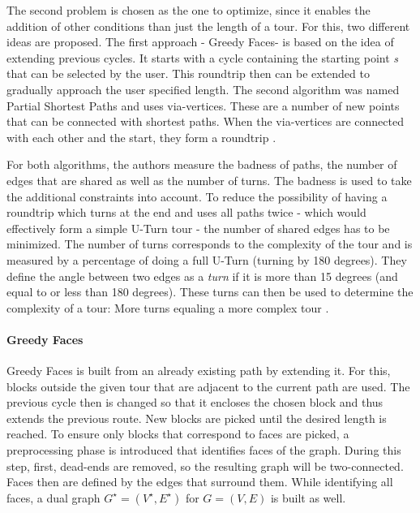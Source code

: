 The second problem is chosen as the one to optimize, since it enables the addition of other conditions than just the length of a tour.
For this, two different ideas are proposed.
The first approach - \glqq Greedy Faces\grqq - is based on the idea of extending previous cycles.
It starts with a cycle containing the starting point \textit{s} that can be selected by the user. 
This roundtrip then can be extended to gradually approach the user specified length. 
The second algorithm was named \glqq Partial Shortest Paths\grqq{} and uses via-vertices.
These are a number of new points that can be connected with shortest paths.
When the via-vertices are connected with each other and the start, they form a roundtrip \cite{gemsa_efficient_2013}.


For both algorithms, the authors measure the badness of paths, the number of edges that are shared as well as the number of turns.
The badness is used to take the additional constraints into account. 
To reduce the possibility of having a roundtrip which turns at the end and uses all paths twice - which would effectively form a simple U-Turn tour - the number of shared edges has to be minimized.
The number of turns corresponds to the complexity of the tour and is measured by a percentage of doing a full U-Turn (turning by 180 degrees). 
They define the angle between two edges as a \textit{turn} if it is more than 15 degrees (and equal to or less than 180 degrees).
These turns can then be used to determine the complexity of a tour:
More turns equaling a more complex tour \cite{gemsa_efficient_2013}.



\paragraph{Greedy Faces}

Greedy Faces is built from an already existing path by extending it.
For this, blocks outside the given tour that are adjacent to the current path are used.
The previous cycle then is changed so that it encloses the chosen block and thus extends the previous route. 
New blocks are picked until the desired length is reached.
To ensure only blocks that correspond to faces are picked, a preprocessing phase is introduced that identifies faces of the graph.
During this step, first, dead-ends are removed, so the resulting graph will be two-connected.
Faces then are defined by the edges that surround them. 
While identifying all faces, a dual graph $G^{\star} = (V^{\star},E^{\star})$ for $G = (V,E)$ is built as well.

